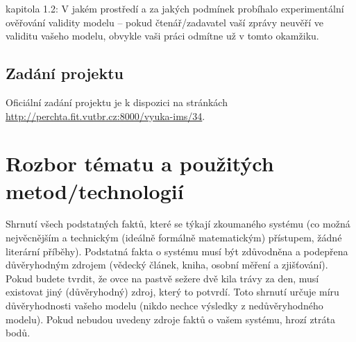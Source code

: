 \documentclass[a4paper,11pt]{article}
\begin{document}
kapitola 1.2: V jakém prostředí a za jakých podmínek probíhalo experimentální ověřování validity modelu – pokud čtenář/zadavatel vaší zprávy neuvěří ve validitu vašeho modelu, obvykle vaši práci odmítne už v tomto okamžiku.

\subsection{Zadání projektu}

Oficiální zadání projektu je k dispozici na stránkách \url{http://perchta.fit.vutbr.cz:8000/vyuka-ims/34}.

\begin{quotation}
\end{quotation}

\section{Rozbor tématu a použitých metod/technologií}

Shrnutí všech podstatných faktů, které se týkají zkoumaného systému (co možná nejvěcnějším a technickým (ideálně formálně matematickým) přístupem, žádné literární příběhy). Podstatná fakta o systému musí být zdůvodněna a podepřena důvěryhodným zdrojem (vědecký článek, kniha, osobní měření a zjišťování). Pokud budete tvrdit, že ovce na pastvě sežere dvě kila trávy za den, musí existovat jiný (důvěryhodný) zdroj, který to potvrdí. Toto shrnutí určuje míru důvěryhodnosti vašeho modelu (nikdo nechce výsledky z nedůvěryhodného modelu). Pokud nebudou uvedeny zdroje faktů o vašem systému, hrozí ztráta bodů.
\end{document}
